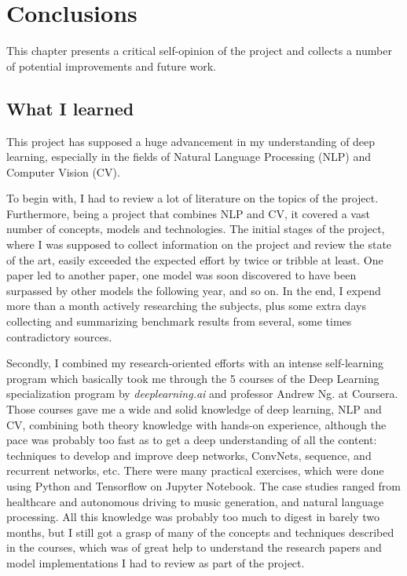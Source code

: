\chapter{Conclusions}
\label{ch:conclusions}

This chapter presents a critical self-opinion of the project and collects a number of potential improvements and future work.

\section{What I learned}

This project has supposed a huge advancement in my understanding of deep learning, especially in the fields of Natural Language Processing (NLP) and Computer Vision (CV). 

To begin with, I had to review a lot of literature on the topics of the project. Furthermore, being a project that combines NLP and CV, it covered a vast number of concepts, models and technologies. The initial stages of the project, where I was supposed to collect information on the project and review the state of the art, easily exceeded the expected effort by twice or tribble at least. One paper led to another paper, one model was soon discovered to have been surpassed by other models the following year, and so on. In the end, I expend more than a month actively researching the subjects, plus some extra days collecting and summarizing benchmark results from several, some times contradictory sources.

Secondly, I combined my research-oriented efforts with an intense self-learning program which basically took me through the 5 courses of the Deep Learning specialization program by \textit{deeplearning.ai} and professor Andrew Ng. at Coursera. Those courses gave me a wide and solid knowledge of deep learning, NLP and CV, combining both theory knowledge with hands-on experience, although the pace was probably too fast as to get a deep understanding of all the content: techniques to develop and improve deep networks, ConvNets, sequence, and recurrent networks, etc. There were many practical exercises, which were done using Python and Tensorflow on Jupyter Notebook. The case studies ranged from healthcare and autonomous driving to music generation, and natural language processing. All this knowledge was probably too much to digest in barely two months, but I still got a grasp of many of the concepts and techniques described in the courses, which was of great help to understand the research papers and model implementations I had to review as part of the project.

